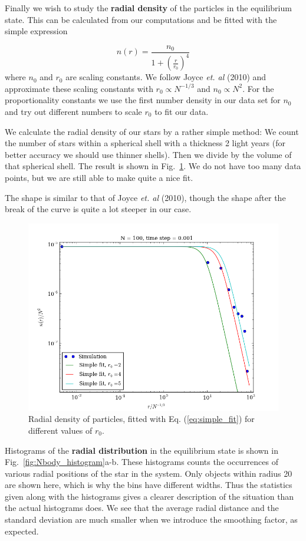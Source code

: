 \documentclass{article}
\begin{document}
\begin{multicols}{2}
Finally we wish to study the \textbf{radial density} of the particles in the equilibrium state. This can be calculated from our computations and be fitted with the simple expression

\begin{equation}\label{eq:simple_fit}
	n(r) = \frac{n_0}{1 + (\frac{r}{r_0})^4}
\end{equation}
where $n_0$ and $r_0$ are scaling constants. We follow Joyce \textit{et. al} (2010) and approximate these scaling constants with $r_0 \propto N^{-1/3}$ and $n_0 \propto N^2$. For the proportionality constants we use the first number density in our data set for $n_0$ and try out different numbers to scale $r_0$ to fit our data.

We calculate the radial density of our stars by a rather simple method: We count the number of stars within a spherical shell with a thickness 2 light years (for better accuracy we should use thinner shells). Then we divide by the volume of that spherical shell. The result is shown in Fig.~\ref{fig:Nbody_radial_dist}. We do not have too many data points, but we are still able to make quite a nice fit.

The shape is similar to that of Joyce \textit{et. al} (2010), though the shape after the break of the curve is quite a lot steeper in our case. 

\begin{figure}
\begin{center}
  	\includegraphics[width=120mm]{Images/radial_distribution_temp.png}
\caption{Radial density of particles, fitted with Eq. (\ref{eq:simple_fit}) for different values of $r_0$.}\label{fig:Nbody_radial_dist}
\end{center}
\end{figure}
Histograms of the \textbf{radial distribution} in the equilibrium state is shown in Fig.~\ref{fig:Nbody_histogram}a-b. These histograms counts the occurrences of various radial positions of the star in the system. Only objects within radius 20 are shown here, which is why the bins have different widths. Thus the statistics given along with the histograms gives a clearer description of the situation than the actual histograms does. We see that the average radial distance and the standard deviation are much smaller when we introduce the smoothing factor, as expected. 


\end{multicols}
\end{document}
